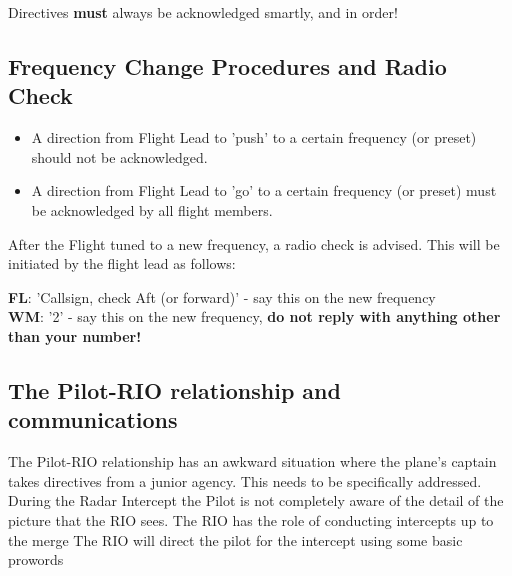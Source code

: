 Directives \textbf{must} always be acknowledged smartly, and in order!

\subsection{Frequency Change Procedures and Radio Check}

\begin{itemize}

 \item A direction from Flight Lead to 'push' to a certain frequency (or
 preset) should not be acknowledged.

 \item A direction from Flight Lead to 'go' to a certain frequency (or preset)
 must be acknowledged by all flight members.

\end{itemize}

After the Flight tuned to a new frequency, a radio check is advised. This will
be initiated by the flight lead as follows:

\textbf{FL}: 'Callsign, check Aft (or forward)' - say this on the new
frequency\\
\textbf{WM}: '2' - say this on the new frequency, \textbf{do not reply with
anything other than your number!}

\subsection{The Pilot-RIO relationship and communications}

The Pilot-RIO relationship has an awkward situation where the plane's captain
takes directives from a junior agency. This needs to be specifically addressed.
During the Radar Intercept the Pilot is not completely aware of the detail of
the picture that the RIO sees. The RIO has the role of conducting intercepts up
to the merge The RIO will direct the pilot for the intercept using some basic
prowords

